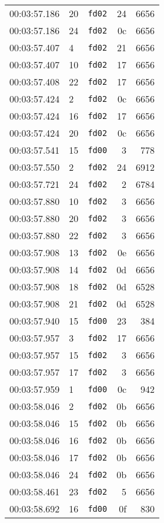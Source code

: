 \documentclass{article}
\begin{document}
\begin{longtable}{lllrr}
00:03:57.186 & 20 & \texttt{fd02} & 24 & 6656 \\
00:03:57.186 & 24 & \texttt{fd02} & 0c & 6656 \\
00:03:57.407 & 4 & \texttt{fd02} & 21 & 6656 \\
00:03:57.407 & 10 & \texttt{fd02} & 17 & 6656 \\
00:03:57.408 & 22 & \texttt{fd02} & 17 & 6656 \\
00:03:57.424 & 2 & \texttt{fd02} & 0c & 6656 \\
00:03:57.424 & 16 & \texttt{fd02} & 17 & 6656 \\
00:03:57.424 & 20 & \texttt{fd02} & 0c & 6656 \\
00:03:57.541 & 15 & \texttt{fd00} & 3 & 778 \\
00:03:57.550 & 2 & \texttt{fd02} & 24 & 6912 \\
00:03:57.721 & 24 & \texttt{fd02} & 2 & 6784 \\
00:03:57.880 & 10 & \texttt{fd02} & 3 & 6656 \\
00:03:57.880 & 20 & \texttt{fd02} & 3 & 6656 \\
00:03:57.880 & 22 & \texttt{fd02} & 3 & 6656 \\
00:03:57.908 & 13 & \texttt{fd02} & 0e & 6656 \\
00:03:57.908 & 14 & \texttt{fd02} & 0d & 6656 \\
00:03:57.908 & 18 & \texttt{fd02} & 0d & 6528 \\
00:03:57.908 & 21 & \texttt{fd02} & 0d & 6528 \\
00:03:57.940 & 15 & \texttt{fd00} & 23 & 384 \\
00:03:57.957 & 3 & \texttt{fd02} & 17 & 6656 \\
00:03:57.957 & 15 & \texttt{fd02} & 3 & 6656 \\
00:03:57.957 & 17 & \texttt{fd02} & 3 & 6656 \\
00:03:57.959 & 1 & \texttt{fd00} & 0c & 942 \\
00:03:58.046 & 2 & \texttt{fd02} & 0b & 6656 \\
00:03:58.046 & 15 & \texttt{fd02} & 0b & 6656 \\
00:03:58.046 & 16 & \texttt{fd02} & 0b & 6656 \\
00:03:58.046 & 17 & \texttt{fd02} & 0b & 6656 \\
00:03:58.046 & 24 & \texttt{fd02} & 0b & 6656 \\
00:03:58.461 & 23 & \texttt{fd02} & 5 & 6656 \\
00:03:58.692 & 16 & \texttt{fd00} & 0f & 830 \\

\end{longtable}
\end{document}
